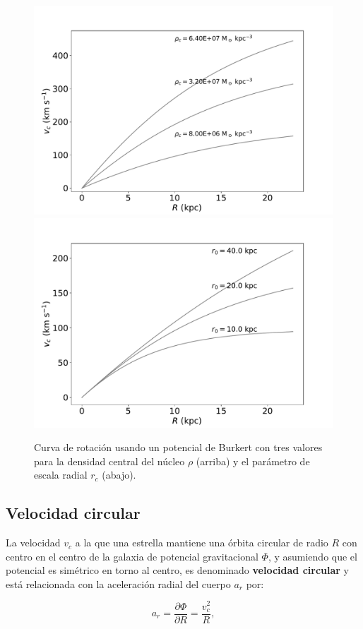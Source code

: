 \begin{figure}
  \centering
    \includegraphics[width=0.8\columnwidth]{Kap2/BK_Amp.pdf}
    \includegraphics[width=0.8\columnwidth]{Kap2/BK_r.pdf}
  \caption{ Curva de rotación usando un potencial de Burkert con tres valores para la densidad central del núcleo $\rho$ (arriba) y el parámetro de escala radial $r_c$ (abajo).}
  \label{fig:Fig_BK_parameters}
\end{figure}

\subsection{Velocidad circular}

La velocidad $v_c$ a la que una estrella mantiene una órbita circular de radio $R$ con centro en el centro de la galaxia de potencial gravitacional $\Phi$, y asumiendo que el potencial es simétrico en torno al centro, es denominado \textbf{velocidad circular} y está relacionada con la aceleración radial del cuerpo $a_r$ por:

$$ a_r = \frac{\partial \Phi }{\partial R} = \frac{v_c^2}{R}, $$

